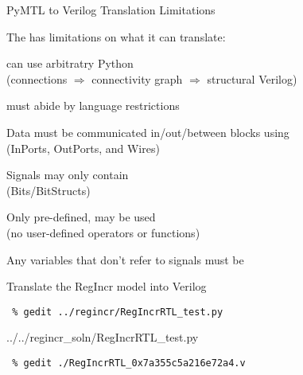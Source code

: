 \begin{frame}{PyMTL to Verilog Translation Limitations}

{}The  has limitations on what it can translate:

\medskip
\begin{cbxlist}[ll]

  \1  can use arbitratry Python \\ (connections
        $\Rightarrow$ connectivity graph $\Rightarrow$ structural
        Verilog)

  \1  must abide by language restrictions

  \pause

    \2 Data must be communicated in/out/between blocks using  \\
       (InPorts, OutPorts, and Wires)

    \2 Signals may only contain  \\
       (Bits/BitStructs)

    \2 Only pre-defined,  may be
       used \\ (no user-defined operators or functions)

    \2 Any variables that don't refer to signals must be 

\end{cbxlist}
\end{frame}

\begin{task}\begin{frame}[fragile]{Translate the RegIncr model into Verilog}

\vspace{-0.15in}
\begin{Verbatim}[commandchars=\\\{\}]
 % cd    \midtilde/pymtl-tut/build
 % gedit ../regincr/RegIncrRTL_test.py
\end{Verbatim}
\vspace{-0.17in}

%
{../../regincr_soln/RegIncrRTL_test.py}

\vspace{-0.2in}
\begin{Verbatim}[commandchars=\\\{\}]
 % py.test ../regincr/RegIncrRTL_test.py -v --test-verilog
 % gedit ./RegIncrRTL_0x7a355c5a216e72a4.v
\end{Verbatim}

\end{frame}
\end{task}

